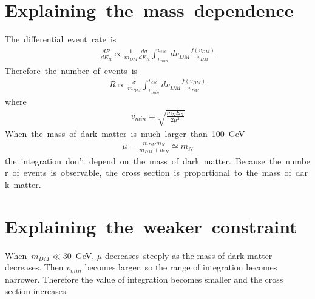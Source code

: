 \section{Explaining\ the\ mass\ dependence}
The\ differential\ event\ rate\ is
\begin{align*}
    \frac{dR}{dE_R}\propto\frac{1}{m_{DM}}\frac{d\sigma}{dE_R}\int^{v_{esc}}_{v_{min}}dv_{DM}\frac{f(v_{DM})}{v_{DM}}
\end{align*}
Therefore\ the\ number\ of\ events\ is
\begin{align*}
    R\propto\frac{\sigma}{m_{DM}}\int^{v_{esc}}_{v_{min}}dv_{DM}\frac{f(v_{DM})}{v_{DM}}
\end{align*}
where
\begin{align*}
    v_{min}=\sqrt{\frac{m_NE_R}{2\mu^2}}
\end{align*}
When\ the\ mass\ of\ dark\ matter\ is\ much\ larger\ than\ 100\ GeV
\begin{align*}
    \mu=\frac{m_{DM}m_N}{m_{DM}+m_N}\simeq m_N
\end{align*}
the\ integration\ don't\ depend\ on\ the\ mass\ of\ dark\ matter.\ Because\ the\ number\ of\ events\ is\ observable,\ the\ cross\ section\ is\ proportional\ to\ the\ mass\ of\ dark\ matter.

\section{Explaining\ the\ weaker\ constraint}
When\ $m_{DM}\ll$30\ GeV, $\mu$ decreases\ steeply as the mass of dark matter decreases. Then $v_{min}$ becomes larger, so the range of integration becomes narrower. Therefore the value of integration becomes smaller and the cross section increases.